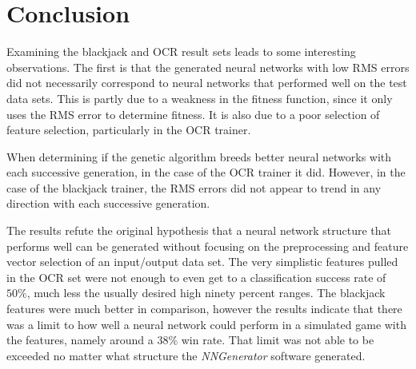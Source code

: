 \section{Conclusion}

Examining the blackjack and OCR result sets leads to some interesting observations.
The first is that the generated neural networks with low RMS errors did not necessarily correspond to neural networks that performed well on the test data sets.
This is partly due to a weakness in the fitness function, since it only uses the RMS error to determine fitness.
It is also due to a poor selection of feature selection, particularly in the OCR trainer.

When determining if the genetic algorithm breeds better neural networks with each successive generation, in the case of the OCR trainer it did.
However, in the case of the blackjack trainer, the RMS errors did not appear to trend in any direction with each successive generation.

The results refute the original hypothesis that a neural network structure that performs well can be generated without focusing on the preprocessing and feature vector selection of an input/output data set.
The very simplistic features pulled in the OCR set were not enough to even get to a classification success rate of $50\%$, much less the usually desired high ninety percent ranges.
The blackjack features were much better in comparison, however the results indicate that there was a limit to how well a neural network could perform in a simulated game with the features, namely around a $38\%$ win rate.
That limit was not able to be exceeded no matter what structure the {\it NNGenerator} software generated.

